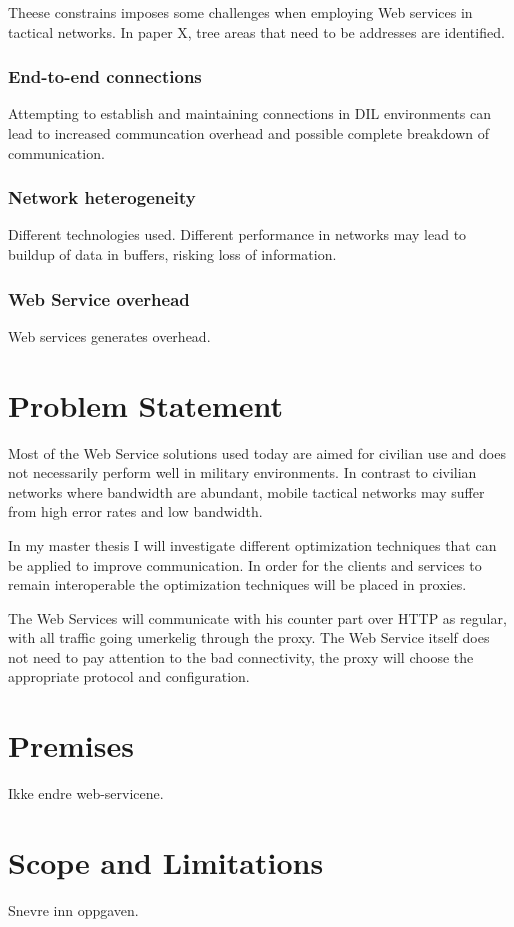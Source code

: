 \documentclass[USenglish]{article}
\begin{document}
Theese constrains imposes some challenges when employing Web services in tactical networks. In paper X, tree areas that need to be addresses are identified\cite{IST-118}.

\label{section:DIL-problems}
\subsubsection{End-to-end connections}
Attempting to establish and maintaining connections in DIL environments can lead to increased communcation overhead and possible complete breakdown of communication.
\subsubsection{Network heterogeneity}
Different technologies used. Different performance in networks may lead to buildup of data in buffers, risking loss of information.
\subsubsection{Web Service overhead}
Web services generates overhead.

\section{Problem Statement}
Most of the Web Service solutions used today are aimed for civilian use and does
not necessarily perform well in military environments. In contrast to civilian
networks where bandwidth are abundant, mobile tactical networks may suffer
from high error rates and low bandwidth.

In my master thesis I will investigate different optimization techniques that
can be applied to improve communication. In order for the clients and services
 to remain interoperable the optimization techniques will be placed in proxies.

The Web Services will communicate with his counter part over HTTP as regular,
with all traffic going umerkelig through the proxy. The Web Service itself does
not need to pay attention to the bad connectivity, the proxy will choose the
appropriate protocol and configuration.

\section{Premises}
Ikke endre web-servicene.

\section{Scope and Limitations}
Snevre inn oppgaven.
\end{document}
